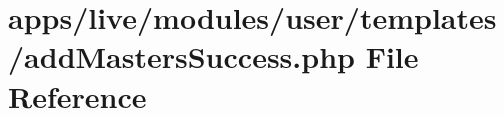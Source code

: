 \hypertarget{live_2modules_2user_2templates_2add_masters_success_8php}{\section{apps/live/modules/user/templates/add\-Masters\-Success.php File Reference}
\label{live_2modules_2user_2templates_2add_masters_success_8php}
}
